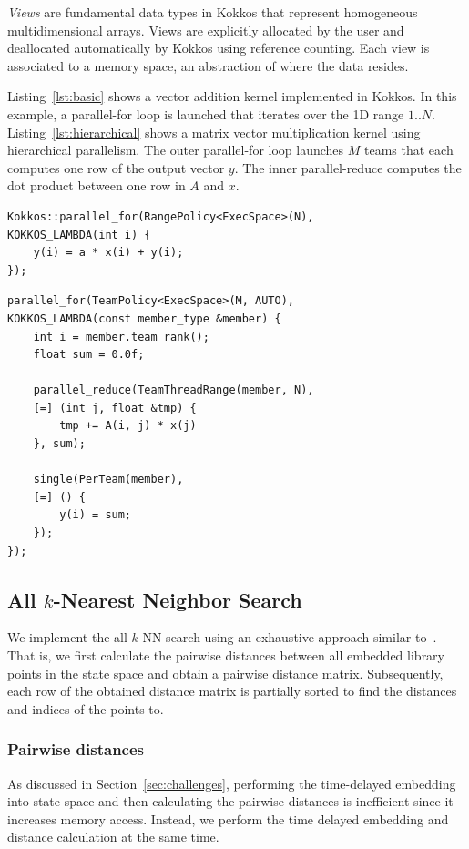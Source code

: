 \documentclass[sigconf]{acmart}
\begin{document}
\textit{Views} are fundamental data types in Kokkos that represent
homogeneous multidimensional arrays. Views are explicitly allocated by the
user and deallocated automatically by Kokkos using reference counting. Each
view is associated to a memory space, an abstraction of where the data
resides.

Listing~\ref{lst:basic} shows a vector addition  kernel implemented in Kokkos.
In this example, a parallel-for loop is launched that iterates over the 1D
range $1..N$.
Listing~\ref{lst:hierarchical} shows a matrix vector multiplication kernel
using hierarchical parallelism. The outer parallel-for loop launches $M$ teams
that each computes one row of the output vector $y$. The inner parallel-reduce
computes the dot product between one row in $A$ and $x$.

\begin{lstlisting}[caption={Basic data parallel loop},label={lst:basic},float]
Kokkos::parallel_for(RangePolicy<ExecSpace>(N),
KOKKOS_LAMBDA(int i) {
    y(i) = a * x(i) + y(i);
});
\end{lstlisting}

\begin{lstlisting}[caption={Hierarchical data parallel loop},label={lst:hierarchical},float]
parallel_for(TeamPolicy<ExecSpace>(M, AUTO),
KOKKOS_LAMBDA(const member_type &member) {
    int i = member.team_rank();
    float sum = 0.0f;

    parallel_reduce(TeamThreadRange(member, N),
    [=] (int j, float &tmp) {
        tmp += A(i, j) * x(j)
    }, sum);

    single(PerTeam(member),
    [=] () {
        y(i) = sum;
    });
});
\end{lstlisting}

\subsection{All $k$-Nearest Neighbor Search}

We implement the all $k$-NN search using an exhaustive approach similar
to~\cite{Garcia2008,Garcia2010}. That is, we first calculate the pairwise
distances between all embedded library points in the state space and obtain a
pairwise distance matrix. Subsequently, each row of the obtained distance
matrix is partially sorted to find the distances and indices of the points to.

\subsubsection{Pairwise distances}
As discussed in Section~\ref{sec:challenges}, performing the time-delayed
embedding into state space and then calculating the pairwise distances is
inefficient since it increases memory access. Instead, we perform the time
delayed embedding and distance calculation at the same time.
\end{document}

